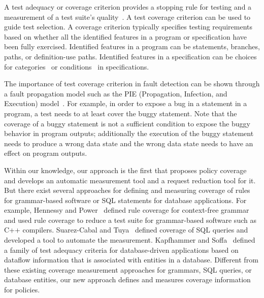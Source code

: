 A test adequacy or coverage criterion provides a stopping rule for
testing and a measurement of a test suite's
quality~\cite{zhu97:software}. A test coverage criterion can be
used to guide test selection. A coverage criterion typically
specifies testing requirements based on whether all the identified
features in a program or specification have been fully exercised.
Identified features in a program can be statements, branches,
paths, or definition-use paths. Identified features in a
specification can be choices for
categories~\cite{amla92:using,ammann94:using} or
conditions~\cite{chang99:structural} in specifications.

The importance of test coverage criterion in fault detection can
be shown through a fault propagation model such as the PIE
(Propagation, Infection, and Execution) model~\cite{voas92:pie}.
For example, in order to expose a bug in a statement in a program,
a test needs to at least cover the buggy statement. Note that the
coverage of a buggy statement is not a sufficient condition to
expose the buggy behavior in program outputs; additionally the
execution of the buggy statement needs to produce a wrong data
state and the wrong data state needs to have an effect on program
outputs.

Within our knowledge, our approach is the first that proposes policy
coverage and develops an automatic measurement tool and a request
reduction tool for it. But there exist several approaches for
defining and measuring coverage of rules for grammar-based software
or SQL statements for database applications. For example, Hennessy
and Power~\cite{hennessy05:analysis} defined rule coverage for
context-free grammar and used rule coverage to reduce a test suite
for grammar-based software such as C++ compilers. Suarez-Cabal and
Tuya~\cite{cabal03:using} defined coverage of SQL queries and
developed a tool to automate the measurement. Kapfhammer and
Soffa~\cite{kapfhammer03:family} defined a family of test adequacy
criteria for database-driven applications based on dataflow
information that is associated with entities in a database.
Different from these existing coverage measurement approaches for
grammars, SQL queries, or database entities, our new approach
defines and measures coverage information for policies.

